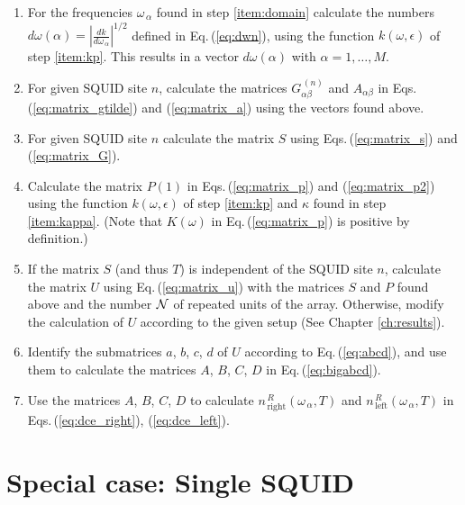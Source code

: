 \begin{enumerate}
\item For the frequencies $\omega_{\,\alpha}$ found in step \ref{item:domain} calculate the numbers
$d\omega(\alpha) = \displaystyle{\left|\frac{dk}{d\omega_{\,\alpha}} \right|^{1/2}}$ defined in Eq.\,(\ref{eq:dwn}), 
using the function $k(\omega,\epsilon)$ of step \ref{item:kp}. 
This results in a vector $d\omega(\alpha)$ with $\alpha = 1, \ldots, M$. 

\item For given SQUID site $n$, calculate the matrices $G_{\alpha \beta}^{\,(n)}$ and $A_{\alpha \beta}$
in Eqs.\,(\ref{eq:matrix_gtilde}) and (\ref{eq:matrix_a}) using the vectors found above.  

\item For given SQUID site $n$ calculate the matrix $S$ using Eqs.\,(\ref{eq:matrix_s}) and (\ref{eq:matrix_G}).  

\item Calculate the matrix $P(1)$ in Eqs.\,(\ref{eq:matrix_p}) and (\ref{eq:matrix_p2})
using the function $k(\omega,\epsilon)$ of step \ref{item:kp} and $\kappa$
found in step \ref{item:kappa}. (Note that $K(\omega)$ in Eq.\,(\ref{eq:matrix_p}) is positive by definition.)

\item If the matrix $S$ (and thus $T$) is independent of the SQUID site $n$, calculate the matrix 
$U$ using Eq.\,(\ref{eq:matrix_u}) with the matrices $S$ and $P$ found above 
and the number ${\cal N}$ of repeated units of the array. Otherwise, modify the calculation of $U$
according to the given setup (See Chapter \ref{ch:results}).

\item \label{item:abcd}
Identify the submatrices $a$, $b$, $c$, $d$ of $U$ according to Eq.\,(\ref{eq:abcd}), and use
them to calculate the matrices $A$, $B$, $C$, $D$ in Eq.\,(\ref{eq:bigabcd}). 

\item \label{item:dce}
Use the matrices $A$, $B$, $C$, $D$ to calculate 
$n_{\,\text{right}}^{\,R}(\omega_{\,\alpha}, T)$ and 
$n_{\,\text{left}}^{\,R}(\omega_{\,\alpha}, T)$ 
in Eqs.\,(\ref{eq:dce_right}), (\ref{eq:dce_left}). 

\end{enumerate}


\section{Special case: Single SQUID}
\label{sec:single}

